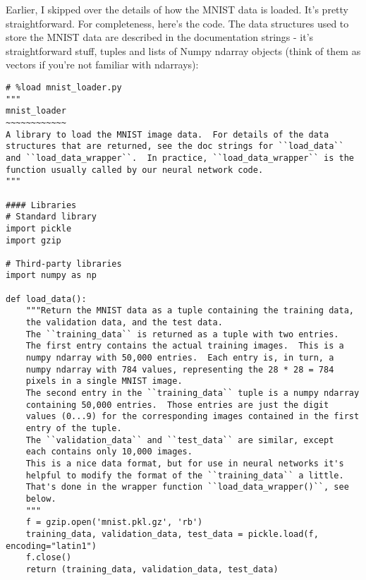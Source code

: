 Earlier, I skipped over the details of how the MNIST data is loaded. It's pretty straightforward. For completeness, here's the code. The data structures used to store the MNIST data are described in the documentation strings - it's straightforward stuff, tuples and lists of Numpy ndarray objects (think of them as vectors if you're not familiar with ndarrays):

\begin{fullwidth}
\begin{lstlisting}
# %load mnist_loader.py
"""
mnist_loader
~~~~~~~~~~~~
A library to load the MNIST image data.  For details of the data
structures that are returned, see the doc strings for ``load_data``
and ``load_data_wrapper``.  In practice, ``load_data_wrapper`` is the
function usually called by our neural network code.
"""

#### Libraries
# Standard library
import pickle
import gzip

# Third-party libraries
import numpy as np

def load_data():
    """Return the MNIST data as a tuple containing the training data,
    the validation data, and the test data.
    The ``training_data`` is returned as a tuple with two entries.
    The first entry contains the actual training images.  This is a
    numpy ndarray with 50,000 entries.  Each entry is, in turn, a
    numpy ndarray with 784 values, representing the 28 * 28 = 784
    pixels in a single MNIST image.
    The second entry in the ``training_data`` tuple is a numpy ndarray
    containing 50,000 entries.  Those entries are just the digit
    values (0...9) for the corresponding images contained in the first
    entry of the tuple.
    The ``validation_data`` and ``test_data`` are similar, except
    each contains only 10,000 images.
    This is a nice data format, but for use in neural networks it's
    helpful to modify the format of the ``training_data`` a little.
    That's done in the wrapper function ``load_data_wrapper()``, see
    below.
    """
    f = gzip.open('mnist.pkl.gz', 'rb')
    training_data, validation_data, test_data = pickle.load(f, encoding="latin1")
    f.close()
    return (training_data, validation_data, test_data)


\end{lstlisting}
\end{fullwidth}

